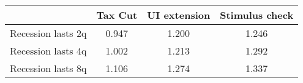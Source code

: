 \begin{tabular}{@{}lccc@{}} 
\toprule 
& Tax Cut    & UI extension    & Stimulus check    \\  \midrule 
Recession lasts 2q &0.947  & 1.200  & 1.246     \\ 
Recession lasts 4q &1.002  & 1.213  & 1.292     \\ 
Recession lasts 8q &1.106  & 1.274  & 1.337     \\ 
\end{tabular}  
